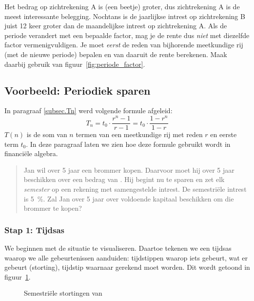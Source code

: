 Het bedrag op zichtrekening A is (een beetje) groter, dus zichtrekening A is de meest interessante belegging. Nochtans is de jaarlijkse intrest op zichtrekening B juist 12 keer groter dan de maandelijkse intrest op zichtrekening A. Als de periode verandert met een bepaalde factor, mag je de rente dus \textit{niet} met diezelfde factor vermenigvuldigen. Je moet \emph{eerst} de reden van bijhorende meetkundige rij (met de nieuwe periode) bepalen en van daaruit de rente berekenen. Maak daarbij gebruik van figuur~\ref{fig:periode_factor}.



\subsection{Voorbeeld: Periodiek sparen} 
\label{vb:persparen}

In paragraaf \ref{subsec.Tn} werd volgende formule afgeleid:
\begin{equation}
    T_{n}=t_{0}\cdot \frac{r^{n}-1}{r-1}=t_{0}\cdot \frac{1-r^{n}}{1-r}
    \label{eq:sommr}
\end{equation}
$T(n)$ is de som van $n$ termen van een meetkundige rij met reden
$r$ en eerste term $t_{0}$. In deze paragraaf laten we zien hoe
deze formule gebruikt wordt in financi\"ele algebra. 

\begin{quote}
    Jan wil over 5 jaar een brommer kopen. Daarvoor moet hij over 5
    jaar beschikken over een bedrag van . Hij begint nu te
    sparen en zet elk \emph{semester}  op een rekening met
    samengestelde intrest. De semestri\"{e}le intrest is \SI{5}{\percent}.
    Zal Jan over 5 jaar over voldoende kapitaal beschikken om
    die brommer te kopen?
\end{quote}

\subsubsection{Stap 1: Tijdsas}
We beginnen met de situatie te visualiseren. Daartoe tekenen we een tijdsas waarop we alle gebeurtenissen aanduiden: tijdstippen waarop iets gebeurt, wat er gebeurt (storting), tijdstip waarnaar gerekend moet worden. Dit wordt getoond in figuur~\ref{fig:t1}. 

    \begin{figure}[htb]
            \centering


        \caption{Semestri\"{e}le stortingen van }
        \label{fig:t1}
    \end{figure}
    \setcounter{tijd}{0}

